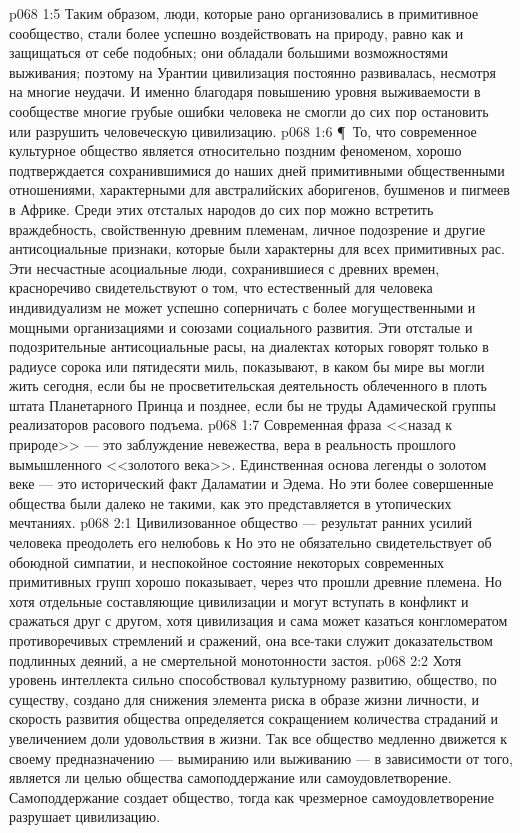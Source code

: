\vs p068 1:5 Таким образом, люди, которые рано организовались в примитивное сообщество, стали более успешно воздействовать на природу, равно как и защищаться от себе подобных; они обладали большими возможностями выживания; поэтому на Урантии цивилизация постоянно развивалась, несмотря на многие неудачи. И именно благодаря повышению уровня выживаемости в сообществе многие грубые ошибки человека не смогли до сих пор остановить или разрушить человеческую цивилизацию.
\vs p068 1:6 \P\ То, что современное культурное общество является относительно поздним феноменом, хорошо подтверждается сохранившимися до наших дней примитивными общественными отношениями, характерными для австралийских аборигенов, бушменов и пигмеев в Африке. Среди этих отсталых народов до сих пор можно встретить враждебность, свойственную древним племенам, личное подозрение и другие антисоциальные признаки, которые были характерны для всех примитивных рас. Эти несчастные асоциальные люди, сохранившиеся с древних времен, красноречиво свидетельствуют о том, что естественный для человека индивидуализм не может успешно соперничать с более могущественными и мощными организациями и союзами социального развития. Эти отсталые и подозрительные антисоциальные расы, на диалектах которых говорят только в радиусе сорока или пятидесяти миль, показывают, в каком бы мире вы могли жить сегодня, если бы не просветительская деятельность облеченного в плоть штата Планетарного Принца и позднее, если бы не труды Адамической группы реализаторов расового подъема.
\vs p068 1:7 Современная фраза <<назад к природе>> --- это заблуждение невежества, вера в реальность прошлого вымышленного <<золотого века>>. Единственная основа легенды о золотом веке --- это исторический факт Даламатии и Эдема. Но эти более совершенные общества были далеко не такими, как это представляется в утопических мечтаниях.
\vs p068 2:1 Цивилизованное общество --- результат ранних усилий человека преодолеть его нелюбовь к  Но это не обязательно свидетельствует об обоюдной симпатии, и неспокойное состояние некоторых современных примитивных групп хорошо показывает, через что прошли древние племена. Но хотя отдельные составляющие цивилизации и могут вступать в конфликт и сражаться друг с другом, хотя цивилизация и сама может казаться конгломератом противоречивых стремлений и сражений, она все\hyp{}таки служит доказательством подлинных деяний, а не смертельной монотонности застоя.
\vs p068 2:2 Хотя уровень интеллекта сильно способствовал культурному развитию, общество, по существу, создано для снижения элемента риска в образе жизни личности, и скорость развития общества определяется сокращением количества страданий и увеличением доли удовольствия в жизни. Так все общество медленно движется к своему предназначению --- вымиранию или выживанию --- в зависимости от того, является ли целью общества самоподдержание или самоудовлетворение. Самоподдержание создает общество, тогда как чрезмерное самоудовлетворение разрушает цивилизацию.
